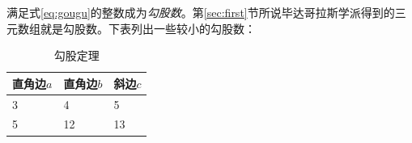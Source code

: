 \documentclass[UTF8]{ctexart}
\begin{document}
满足式\eqref{eq:gougu}的整数成为\emph{勾股数}。第\ref{sec:first}节所说毕达哥拉斯学派得到的三元数组就是勾股数。下表列出一些较小的勾股数：
\begin{table}[h]
\centering
\begin{tabular}{|lll|}
\hline
直角边$a$ & 直角边$b$ & 斜边$c$ \\
\hline
3 & 4 & 5 \\
5 & 12 & 13 \\
\hline
\end{tabular}
\caption{勾股定理}
\end{table}


\nocite{Shiye}

\end{document}

